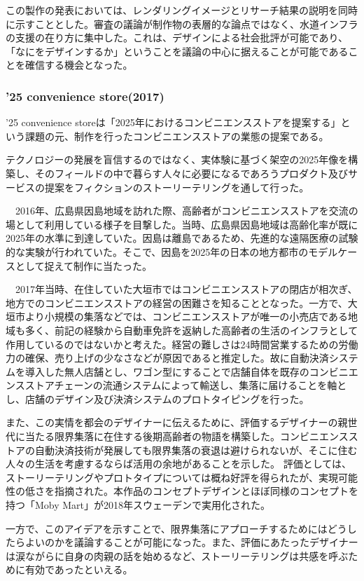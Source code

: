 \documentclass{jsarticle}
\begin{document}
この製作の発表においては、レンダリングイメージとリサーチ結果の説明を同時に示すこととした。審査の議論が制作物の表層的な論点ではなく、水道インフラの支援の在り方に集中した。これは、デザインによる社会批評が可能であり、「なにをデザインするか」ということを議論の中心に据えることが可能であることを確信する機会となった。


\subsubsection{’25 convenience store(2017)}
 ’25 convenience storeは「2025年におけるコンビニエンスストアを提案する」という課題の元、制作を行ったコンビニエンスストアの業態の提案である。

 テクノロジーの発展を盲信するのではなく、実体験に基づく架空の2025年像を構築し、そのフィールドの中で暮らす人々に必要になるであろうプロダクト及びサービスの提案をフィクションのストーリーテリングを通して行った。

　2016年、広島県因島地域を訪れた際、高齢者がコンビニエンスストアを交流の場として利用している様子を目撃した。当時、広島県因島地域は高齢化率が既に2025年の水準に到達していた。因島は離島であるため、先進的な遠隔医療の試験的な実験が行われていた。そこで、因島を2025年の日本の地方都市のモデルケースとして捉えて制作に当たった。

　2017年当時、在住していた大垣市ではコンビニエンスストアの閉店が相次ぎ、地方でのコンビニエンスストアの経営の困難さを知ることとなった。一方で、大垣市より小規模の集落などでは、コンビニエンスストアが唯一の小売店である地域も多く、前記の経験から自動車免許を返納した高齢者の生活のインフラとして作用しているのではないかと考えた。経営の難しさは24時間営業するための労働力の確保、売り上げの少なさなどが原因であると推定した。故に自動決済システムを導入した無人店舗とし、ワゴン型にすることで店舗自体を既存のコンビニエンスストアチェーンの流通システムによって輸送し、集落に届けることを軸とし、店舗のデザイン及び決済システムのプロトタイピングを行った。

 また、この実情を都会のデザイナーに伝えるために、評価するデザイナーの親世代に当たる限界集落に在住する後期高齢者の物語を構築した。コンビニエンスストアの自動決済技術が発展しても限界集落の衰退は避けられないが、そこに住む人々の生活を考慮するならば活用の余地があることを示した。
 評価としては、ストーリーテリングやプロトタイプについては概ね好評を得られたが、実現可能性の低さを指摘された。本作品のコンセプトデザインとほぼ同様のコンセプトを持つ「Moby Mart」が2018年スウェーデンで実用化された。

 一方で、このアイデアを示すことで、限界集落にアプローチするためにはどうしたらよいのかを議論することが可能になった。また、評価にあたったデザイナーは涙ながらに自身の肉親の話を始めるなど、ストーリーテリングは共感を呼ぶために有効であったといえる。
\end{document}
